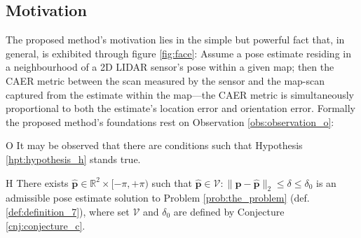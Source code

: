 \subsection{Motivation}

The proposed method's motivation lies in the simple but powerful fact that, in
general, is exhibited through figure \ref{fig:face}: Assume a pose estimate
residing in a neighbourhood of a 2D LIDAR sensor's pose within a given map;
then the CAER metric between the scan measured by the sensor and the map-scan
captured from the estimate within the map---the CAER metric is simultaneously
proportional to both the estimate's location error and orientation error.
Formally the proposed method's foundations rest on Observation
\ref{obs:observation_o}:

\begin{customobs}{O}
  \label{obs:observation_o} It may be observed that there are conditions such
  that Hypothesis \ref{hpt:hypothesis_h} stands true.
\end{customobs}

\begin{customhpt}{H}
  \label{hpt:hypothesis_h}
  There exists $\hat{\bm{p}} \in  \mathbb{R}^2 \times [-\pi,+\pi)$ such that
  $\hat{\bm{p}} \in \mathcal{V}: \|\bm{p}-\hat{\bm{p}}\|_2 \leq \delta \leq \delta_0$
  is an admissible pose estimate solution to Problem \ref{prob:the_problem}
  (def. \ref{def:definition_7}), where set $\mathcal{V}$ and $\delta_0$ are
  defined by Conjecture
  \ref{cnj:conjecture_c}.
\end{customhpt}

